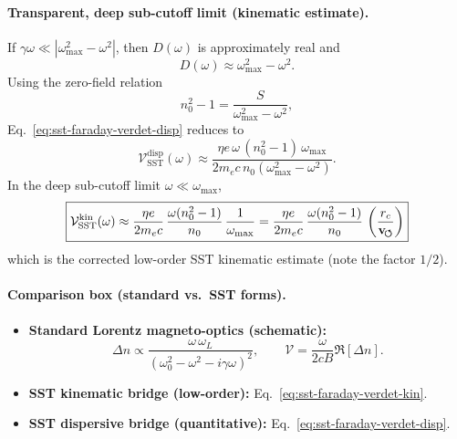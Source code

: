 \documentclass[10pt]{article}
\newcommand{\vswirl}{\mathbf{v}_{\!\boldsymbol{\circlearrowleft}}}
\begin{document}
        \paragraph{Transparent, deep sub-cutoff limit (kinematic estimate).}
            If \(\gamma\omega\ll \left|\omega_{\max}^2-\omega^2\right|\), then \(D(\omega)\) is approximately real and
            \[
                D(\omega)\approx \omega_{\max}^2-\omega^2.
            \]
            Using the zero-field relation
            \begin{equation}
                n_0^2-1=\frac{S}{\omega_{\max}^2-\omega^2},
                \label{eq:sst-faraday-zero-field-index}
            \end{equation}
            Eq.~\eqref{eq:sst-faraday-verdet-disp} reduces to
            \begin{equation}
                \mathcal{V}_{\mathrm{SST}}^{\mathrm{disp}}(\omega)
                \approx
                \frac{\eta e\,\omega\,(n_0^2-1)\,\omega_{\max}}
                {2m_e c\,n_0\left(\omega_{\max}^2-\omega^2\right)}.
                \label{eq:sst-faraday-verdet-subcutoff}
            \end{equation}
            In the deep sub-cutoff limit \(\omega\ll \omega_{\max}\),
            \begin{equation}
                \boxed{
                    \mathcal{V}_{\mathrm{SST}}^{\mathrm{kin}}(\omega)
                    \approx
                    \frac{\eta e}{2m_e c}\,
                    \frac{\omega(n_0^2-1)}{n_0}\,
                    \frac{1}{\omega_{\max}}
                    =
                    \frac{\eta e}{2m_e c}\,
                    \frac{\omega(n_0^2-1)}{n_0}\,
                    \left(\frac{\rc}{\vswirl}\right)
                }
                \label{eq:sst-faraday-verdet-kin}
            \end{equation}
            which is the corrected low-order SST kinematic estimate (note the factor \(1/2\)).

        \paragraph{Comparison box (standard vs.\ SST forms).}
            \begin{itemize}
                \item \textbf{Standard Lorentz magneto-optics (schematic):}
                \[
                    \Delta n \propto \frac{\omega\,\omega_L}{\left(\omega_0^2-\omega^2-i\gamma\omega\right)^2},
                    \qquad
                    \mathcal{V}=\frac{\omega}{2cB}\Re[\Delta n].
                \]
                \item \textbf{SST kinematic bridge (low-order):} Eq.~\eqref{eq:sst-faraday-verdet-kin}.
                \item \textbf{SST dispersive bridge (quantitative):} Eq.~\eqref{eq:sst-faraday-verdet-disp}.
            \end{itemize}
\end{document}
